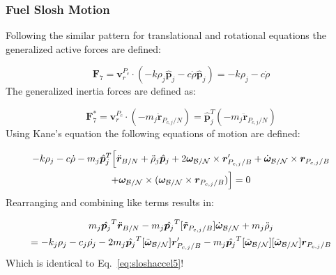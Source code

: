 \subsubsection{Fuel Slosh Motion}
Following the similar pattern for translational and rotational equations the generalized active forces are defined:

\begin{equation}
	\bm F_{7} = \bm v^{P_c}_{r} \cdot (-k\rho_j \hat{\bm p}_j - c \dot{\rho} \hat{\bm p}_j) = -k\rho_j - c \dot{\rho}
\end{equation}
The generalized inertia forces are defined as: 

\begin{equation}
	\bm F^*_{7} = \bm v^{P_c}_{r} \cdot (-m_j \ddot{\bm r}_{P_{c,j}/N}) = \hat{\bm p}_j^T (-m_j \ddot{\bm r}_{P_{c,j}/N})
\end{equation}
Using Kane's equation the following equations of motion are defined:

\begin{multline}
	-k\rho_j - c \dot{\rho} - m_j \hat{\bm p}_j^T \Big[\ddot{\bm r}_{B/N} + \ddot{\rho}_j \hat{\bm p}_j  +2 \bm\omega_{\cal B/N} \times \bm{r}'_{P_{c,j}/B} + \dot{\bm\omega}_{\cal B/N} \times \bm{r}_{P_{c,j}/B}  \\
	+\bm\omega_{\cal B/N} \times (\bm\omega_{\cal B/N} \times \bm{r}_{P_{c,j}/B})\Big] = 0 
\end{multline}
Rearranging and combining like terms results in:

\begin{multline}
	m_j \hat{\bm p_j}^T \ddot{\bm{r}}_{B/N} - m_j \hat{\bm p_j}^T [\tilde{\bm{r}}_{P_{c,j}/B}] \dot{\bm\omega}_{\cal B/N} + m_j \ddot{\rho}_j  \\
	= - k_j \rho_j - c_j \dot{\rho_j} - 2 m_j \hat{\bm p_j}^T  [\tilde{\bm\omega}_{\cal B/N}] \bm{r}'_{P_{c,j}/B}  - m_j \hat{\bm p_j}^T [\tilde{\bm\omega}_{\cal B/N}] [\tilde{\bm\omega}_{\cal B/N}] \bm{r}_{P_{c,j}/B} 
	\label{eq:sloshaccel6}
\end{multline}	
Which is identical to Eq.~\eqref{eq:sloshaccel5}!


